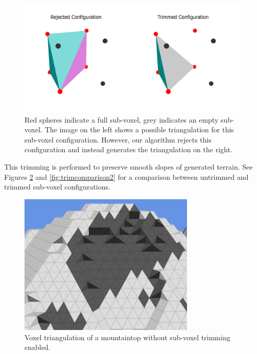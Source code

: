 \begin{figure}
	\centering
		\includegraphics[width=1.0\textwidth]{figures/voxelrejected.png}
	\caption{
		Red spheres indicate a full sub-voxel, grey indicates an empty sub-voxel.
		The image on the left shows a possible triangulation for this sub-voxel configuration.
		However, our algorithm rejects this configuration and instead generates the triangulation on the right.
	}
	\label{fig:voxelrejected}
\end{figure}

This trimming is performed to preserve smooth slopes of generated terrain.
See Figures \ref{fig:trimcomparison1} and \ref{fig:trimcomparison2} for a comparison between untrimmed and trimmed sub-voxel configurations.

\begin{figure}
	\centering
		\includegraphics[width=0.75\textwidth]{figures/trimcomparison1.png}
	\caption{
		Voxel triangulation of a mountaintop without sub-voxel trimming enabled.
	}
	\label{fig:trimcomparison1}
\end{figure}

